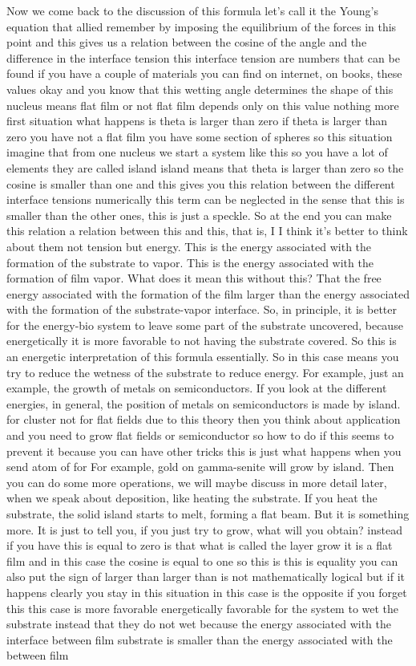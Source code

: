 Now we come back to the discussion of this formula let's call it the Young's equation that allied remember by imposing the equilibrium of the forces in this point and this gives us a relation between the cosine of the angle and the difference in the interface tension this interface tension are numbers that can be found if you have a couple of materials you can find on internet, on books, these values okay and you know that this wetting angle determines the shape of this nucleus means flat film or not flat film depends only on this value nothing more first situation what happens is theta is larger than zero if theta is larger than zero you have not a flat film you have some section of spheres so this situation imagine that from one nucleus we start a system like this so you have a lot of elements they are called island island means that theta is larger than zero so the cosine is smaller than one and this gives you this relation between the different interface tensions numerically this term can be neglected in the sense that this is smaller than the other ones, this is just a speckle. So at the end you can make this relation a relation between this and this, that is, I I think it's better to think about them not tension but energy. This is the energy associated with the formation of the substrate to vapor. This is the energy associated with the formation of film vapor. What does it mean this without this? That the free energy associated with the formation of the film larger than the energy associated with the formation of the substrate-vapor interface. So, in principle, it is better for the energy-bio system to leave some part of the substrate uncovered, because energetically it is more favorable to not having the substrate covered. So this is an energetic interpretation of this formula essentially. So in this case means you try to reduce the wetness of the substrate to reduce energy. For example, just an example, the growth of metals on semiconductors. If you look at the different energies, in general, the position of metals on semiconductors is made by island. for cluster not for flat fields due to this theory then you think about application and you need to grow flat fields or semiconductor so how to do if this seems to prevent it because you can have other tricks this is just what happens when you send atom of for For example, gold on gamma-senite will grow by island. Then you can do some more operations, we will maybe discuss in more detail later, when we speak about deposition, like heating the substrate. If you heat the substrate, the solid island starts to melt, forming a flat beam. But it is something more. It is just to tell you, if you just try to grow, what will you obtain? instead if you have this is equal to zero is that what is called the layer grow it is a flat film and in this case the cosine is equal to one so this is this is equality you can also put the sign of larger than larger than is not mathematically logical but if it happens clearly you stay in this situation in this case is the opposite if you forget this this case is more favorable energetically favorable for the system to wet the substrate instead that they do not wet because the energy associated with the interface between film substrate is smaller than the energy associated with the between film 